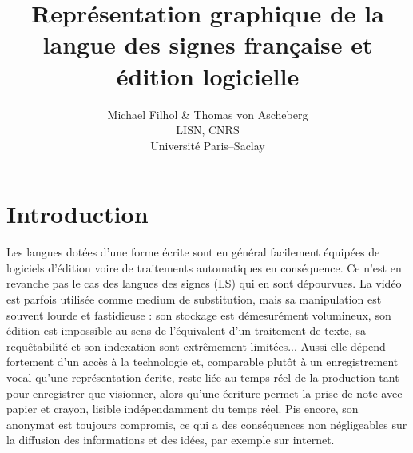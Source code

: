 \documentclass[french,utf8x]{article}
\begin{document}
\title{Représentation graphique de la langue des signes française et édition logicielle}
\maketitle

\begin{center}
\author{Michael Filhol \& Thomas von Ascheberg \\
 LISN, CNRS\\
 Université Paris--Saclay
}
\end{center}





\section{Introduction}
Les langues dotées d'une forme écrite sont en général facilement équipées de logiciels d'édition voire de traitements automatiques en conséquence.
Ce n'est en revanche pas le cas des langues des signes (LS) qui en sont dépourvues.
La vidéo est parfois utilisée comme medium de substitution, mais sa manipulation est souvent lourde et fastidieuse : son stockage est démesurément volumineux, son édition est impossible au sens de l'équivalent d'un traitement de texte, sa requêtabilité et son indexation sont extrêmement limitées...
Aussi elle dépend fortement d'un accès à la technologie et, comparable plutôt à un enregistrement vocal qu'une représentation écrite, reste liée au temps réel de la production tant pour enregistrer que visionner, alors qu'une écriture permet la prise de note avec papier et crayon, lisible indépendamment du temps réel.
Pis encore, son anonymat est toujours compromis, ce qui a des conséquences non négligeables sur la diffusion des informations et des idées, par exemple sur internet.
\end{document}
